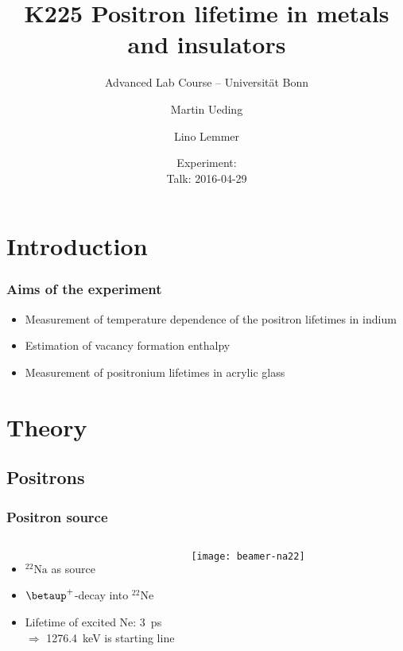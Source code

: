 \documentclass[english, fleqn]{beamer}
\title{K225 Positron lifetime in metals and insulators}
\subtitle{Advanced Lab Course -- Universität Bonn}
\author{%
    Martin Ueding
    \and
    Lino Lemmer
}
\date{Experiment: \daterange{2016-03-24}{2016-03-25} \\ Talk: 2016-04-29}
\begin{document}
\begin{frame}
    \titlepage
\end{frame}

\begin{frame}
    \titlepage
\end{frame}

\section{Introduction}

\begin{frame}
    \frametitle{Aims of the experiment}
    \begin{itemize}
        \item 
            Measurement of temperature dependence of the positron lifetimes in indium
        \item
            Estimation of vacancy formation enthalpy
        \item
            Measurement of positronium lifetimes in acrylic glass
    \end{itemize}
\end{frame}

\section{Theory}

\subsection{Positrons}

\begin{frame}
    \frametitle{Positron source}
    \begin{columns}[c]
        \begin{itemize}
            \item 
                ${}^{22}\text{Na}$ as source
            \item
                $\betaup^+$-decay into ${}^{22}\text{Ne}$
            \item
                Lifetime of excited Ne: \SI{3}{\pico\second} \\
                $\Rightarrow$ \SI{1276.4}{\kilo\electronvolt} is starting line
        \end{itemize}
        \centering
        \texttt{[image: beamer-na22]}
    \end{columns}
\end{frame}
\end{document}
